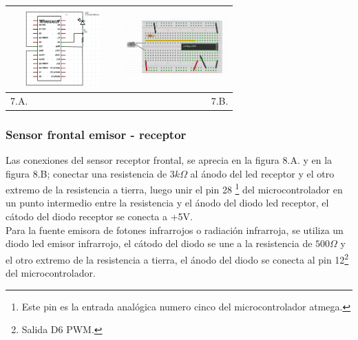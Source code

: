 \documentclass[12]{article}
\newenvironment{Figure}
{\par\medskip\noindent\minipage{\linewidth}}
{\endminipage\par\medskip}
\begin{document}
\begin{multicols}{2}
\begin{Figure}
\center
\begin{tabular}{|l|r|}
\hline
\includegraphics[width=4cm, height=3cm]{img/senlaesq.png} & \includegraphics[width=4cm, height=3cm]{img/senlapro.png} \\ \hline
7.A. & 7.B. \\ \hline
\end{tabular}
\label{fig:g7}
\end{Figure}


\subsubsection{Sensor frontal emisor - receptor}
Las conexiones del sensor receptor frontal, se aprecia en la figura 8.A. y en la figura 8.B; conectar una resistencia de $3 k\Omega$ al ánodo del led receptor y el otro extremo de la resistencia a tierra, luego unir el pin 28 \footnote{Este pin es la entrada analógica numero cinco del microcontrolador atmega.} del microcontrolador en un punto intermedio entre la resistencia y el ánodo del diodo led receptor, el cátodo del diodo receptor se conecta a +5V.\\

Para la  fuente emisora de fotones infrarrojos o radiación infrarroja, se utiliza un diodo led emisor infrarrojo, el cátodo del diodo se une  a la resistencia de $500 \Omega$ y el otro extremo de la resistencia a tierra, el ánodo del diodo se conecta al pin 12\footnote{Salida D6 PWM.} del microcontrolador.\\


\end{multicols}
\end{document}
